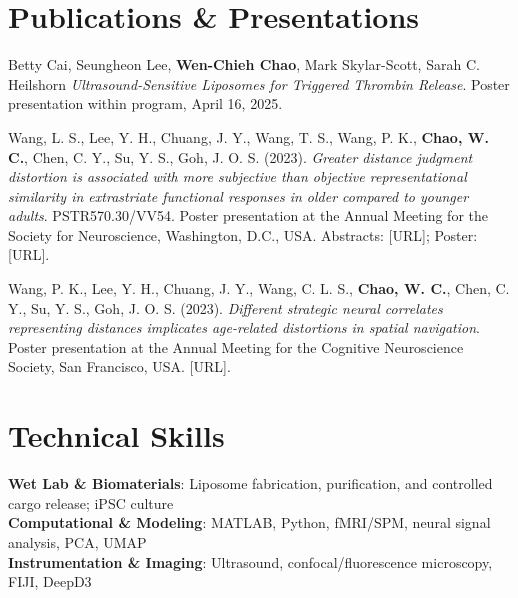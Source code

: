 \documentclass[letterpaper,11pt]{article}
\newcommand{\skillItem}[2]{\textbf{#1}{: #2}\\[0pt]}
\begin{document}
\section{Publications \& Presentations}
\begin{itemize}[leftmargin=0.15in, label={}]   
  \small{
    \item Betty Cai, Seungheon Lee, \textbf{Wen-Chieh Chao}, Mark Skylar-Scott, Sarah C. Heilshorn
    \textit{Ultrasound-Sensitive Liposomes for Triggered Thrombin Release}. Poster presentation within program, April 16, 2025.

    \item Wang, L. S., Lee, Y. H., Chuang, J. Y., Wang, T. S., Wang, P. K., \textbf{Chao, W. C.}, Chen, C. Y., Su, Y. S., Goh, J. O. S. (2023).
    \textit{Greater distance judgment distortion is associated with more subjective than objective representational similarity in extrastriate functional responses in older compared to younger adults}. PSTR570.30/VV54. Poster presentation at the Annual Meeting for the Society for Neuroscience, Washington, D.C., USA. Abstracts: [URL]; Poster: [URL].

    \item Wang, P. K., Lee, Y. H., Chuang, J. Y., Wang, C. L. S., \textbf{Chao, W. C.}, Chen, C. Y., Su, Y. S., Goh, J. O. S. (2023).
    \textit{Different strategic neural correlates representing distances implicates age-related distortions in spatial navigation}. Poster presentation at the Annual Meeting for the Cognitive Neuroscience Society, San Francisco, USA. [URL].
  }
\end{itemize}



\section{Technical Skills}
\begin{itemize}[leftmargin=0.15in, label={}]   
  \small{\item{
    \skillItem{Wet Lab \& Biomaterials}{Liposome fabrication, purification, and controlled cargo release; iPSC culture}
    \skillItem{Computational \& Modeling}{MATLAB, Python, fMRI/SPM, neural signal analysis, PCA, UMAP}
    \skillItem{Instrumentation \& Imaging}{Ultrasound, confocal/fluorescence microscopy, FIJI, DeepD3}
  }}
\end{itemize}



\end{document}
